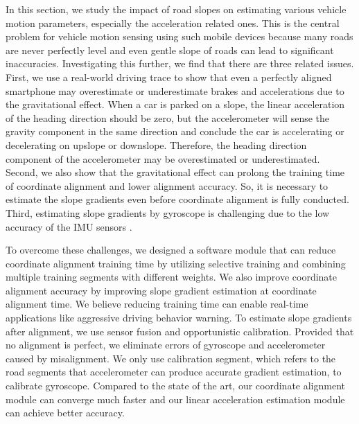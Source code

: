 \iffalse
But none of those work addressed the problems caused by road slope
and the method to estimate slope gradients before and after coordinate
alignments.
Also, it is still an open question that how fast 
alignment algorithm can converge, e.g., if an algorithm requires the whole
trip to train the algorithm, then it can not be used in real-time applications for short trips.
\fi


In this section, we study the impact of road slopes on estimating various vehicle motion
parameters, especially the acceleration related ones. This is the central problem for
vehicle motion sensing using such mobile devices because many roads are never perfectly
level and even gentle slope of roads can lead to significant inaccuracies.
Investigating this further, we find that there
are three related issues.
First, we use a real-world driving trace to show that
even a perfectly aligned smartphone may overestimate or
underestimate brakes and accelerations due to the gravitational
effect.
When a car is parked on a slope, the linear acceleration
of the heading direction should be zero, 
but the accelerometer will 
sense the gravity component  in the same direction and conclude
the car is accelerating or decelerating on upslope or downslope. 
Therefore, the heading direction component of the accelerometer may be overestimated or underestimated.
Second, we also show that the gravitational effect can prolong the training time
of coordinate alignment and lower alignment accuracy. 
So, it is necessary to estimate the slope gradients even before
coordinate alignment is fully conducted.
Third, estimating slope gradients by gyroscope is challenging due
to the low accuracy of the IMU sensors \cite{zhou2014use}.


To overcome these challenges, we designed a software module that 
can reduce coordinate alignment training time by utilizing selective
training and combining multiple training segments with different weights. 
We also improve coordinate alignment accuracy by 
improving slope gradient estimation at coordinate alignment time.
We believe reducing training time can enable real-time applications like 
aggressive driving behavior warning.
To estimate slope gradients after alignment, 
we use sensor fusion and opportunistic calibration.
Provided that no alignment is perfect, 
we eliminate errors of gyroscope and accelerometer caused by
misalignment.
We only use calibration segment,
which refers to the road segments that accelerometer can produce accurate gradient estimation,
to calibrate gyroscope. 
Compared to the state of the art, our coordinate alignment module can converge much 
faster and our linear acceleration estimation module can achieve better accuracy. 


